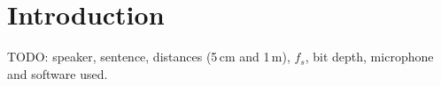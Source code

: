 \section{Introduction}
TODO: speaker, sentence, distances (5\,cm and 1\,m), $f_s$, bit depth, microphone and
software used.
